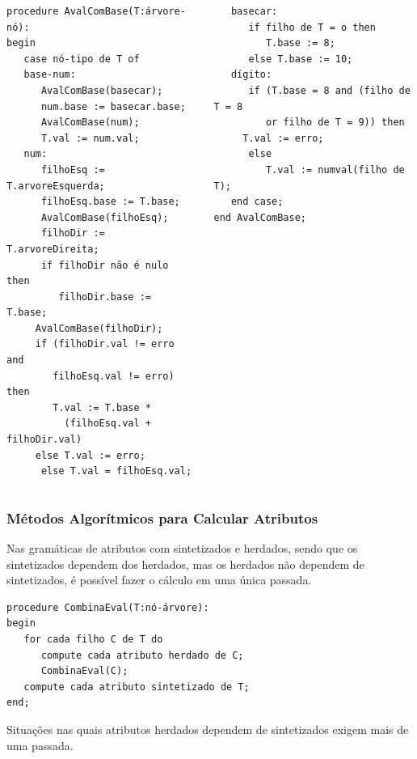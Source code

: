 \documentclass[table]{beamer}
\begin{document}
\begin{frame}[fragile]
   \scriptsize
   \begin{columns}
   \begin{column}{0.5\textwidth}
   \begin{verbatim}
procedure AvalComBase(T:árvore-nó):
begin
   case nó-tipo de T of
   base-num:
      AvalComBase(basecar);
      num.base := basecar.base;
      AvalComBase(num);
      T.val := num.val;
   num:
      filhoEsq := T.arvoreEsquerda;
      filhoEsq.base := T.base;
      AvalComBase(filhoEsq);
      filhoDir := T.arvoreDireita;
      if filhoDir não é nulo then
         filhoDir.base := T.base;
	 AvalComBase(filhoDir);
	 if (filhoDir.val != erro and 
	    filhoEsq.val != erro) then
	    T.val := T.base * 
	      (filhoEsq.val + filhoDir.val)
	 else T.val := erro;
      else T.val = filhoEsq.val;	   
  \end{verbatim}
   \end{column}
   \begin{column}{0.5\textwidth}
   \begin{verbatim}
   basecar:
      if filho de T = o then 
         T.base := 8;
      else T.base := 10;
   dígito:
      if (T.base = 8 and (filho de T = 8 
         or filho de T = 9)) then
	 T.val := erro;
      else
         T.val := numval(filho de T);
   end case;	 
end AvalComBase;
   \end{verbatim}
   \end{column}
   \end{columns}
\end{frame}

\begin{frame}[fragile]
   \frametitle{Métodos Algorítmicos para Calcular Atributos}
   Nas gramáticas de atributos com sintetizados e herdados, sendo que os sintetizados dependem dos herdados, mas os herdados não dependem de sintetizados, é possível fazer o cálculo em uma única passada.
   \begin{verbatim}
procedure CombinaEval(T:nó-árvore):
begin
   for cada filho C de T do
      compute cada atributo herdado de C;
      CombinaEval(C);
   compute cada atributo sintetizado de T;   
end;
   \end{verbatim}
   Situações nas quais atributos herdados dependem de sintetizados exigem mais de uma passada.
\end{frame}
\end{document}
